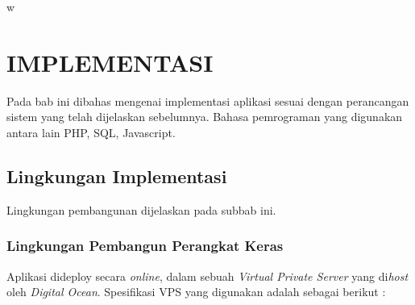w\chapter{IMPLEMENTASI}
  Pada bab ini dibahas mengenai implementasi aplikasi sesuai dengan perancangan sistem yang telah dijelaskan sebelumnya. Bahasa pemrograman yang digunakan antara lain PHP, SQL, Javascript.
  
  \section{Lingkungan Implementasi}
  Lingkungan pembangunan dijelaskan pada subbab ini.
  
  
  \subsection{Lingkungan Pembangun Perangkat Keras}
  
  Aplikasi dideploy secara \textit{online}, dalam sebuah \textit{Virtual Private Server} yang di\textit{host} oleh \textit{Digital Ocean}.
  Spesifikasi VPS yang digunakan adalah sebagai berikut :
  
